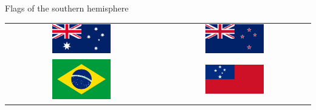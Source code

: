 \documentclass[compress,aspectratio=169,10pt,usenames,dvipsnames]{beamer}
\begin{document}

\begin{frame}

\begin{block}{Flags of the southern hemisphere}
\begin{center}
\begin{tabular}{cc}
\includegraphics[width = 0.4\textwidth]{Flag_of_Australia} & \includegraphics[width = 0.4\textwidth]{Flag_of_New_Zealand} \\
\includegraphics[width = 0.4\textwidth]{Flag_of_Brazil} & \includegraphics[width = 0.4\textwidth]{Flag_of_Samoa}
\end{tabular}
\end{center}
\end{block}

\end{frame}

\end{document}
